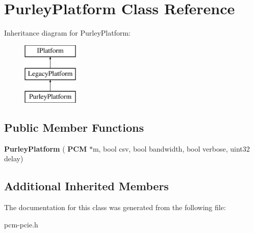 \section{Purley\+Platform Class Reference}
\label{classPurleyPlatform}
Inheritance diagram for Purley\+Platform\+:\begin{figure}[H]
\begin{center}
\leavevmode
\includegraphics[height=3.000000cm]{classPurleyPlatform}
\end{center}
\end{figure}
\subsection*{Public Member Functions}
\begin{DoxyCompactItemize}
\item 
\mbox{\label{classPurleyPlatform_a3901cb06f5f2a2b664d86a41f82ff0a2}} 
{\bfseries Purley\+Platform} (\textbf{ P\+CM} $\ast$m, bool csv, bool bandwidth, bool verbose, uint32 delay)
\end{DoxyCompactItemize}
\subsection*{Additional Inherited Members}


The documentation for this class was generated from the following file\+:\begin{DoxyCompactItemize}
\item 
pcm-\/pcie.\+h\end{DoxyCompactItemize}
